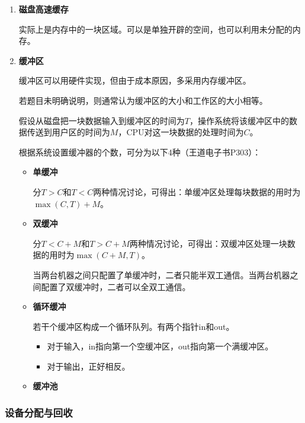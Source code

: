 \documentclass[12pt, a4paper, oneside]{ctexart}
\begin{document}
\begin{enumerate}
  \item {\bf 磁盘高速缓存}
  
  实际上是内存中的一块区域。可以是单独开辟的空间，也可以利用未分配的内存。

  \item {\bf 缓冲区}
  
  缓冲区可以用硬件实现，但由于成本原因，多采用内存缓冲区。

  若题目未明确说明，则通常认为缓冲区的大小和工作区的大小相等。
  
  假设从磁盘把一块数据输入到缓冲区的时间为$T$，操作系统将该缓冲区中的数据传送到用户区的时间为$M$，CPU对这一块数据的处理时间为$C$。

  根据系统设置缓冲器的个数，可分为以下4种（王道电子书P303）：
  \begin{itemize}
    \item {\bf 单缓冲}
    
    分$T>C$和$T<C$两种情况讨论，可得出：单缓冲区处理每块数据的用时为$\max(C,T)+M$。

    \item {\bf 双缓冲}
    
    分$T<C+M$和$T>C+M$两种情况讨论，可得出：双缓冲区处理一块数据的用时为$\max(C+M, T)$。

    当两台机器之间只配置了单缓冲时，二者只能半双工通信。当两台机器之间配置了双缓冲时，二者可以全双工通信。

    \item {\bf 循环缓冲}
    
    若干个缓冲区构成一个循环队列。有两个指针in和out。
    \begin{itemize}
      \item 对于输入，in指向第一个空缓冲区，out指向第一个满缓冲区。
      \item 对于输出，正好相反。
    \end{itemize}
    
    \item {\bf 缓冲池}
  \end{itemize}
\end{enumerate}

\subsubsection{设备分配与回收}
\end{document}
